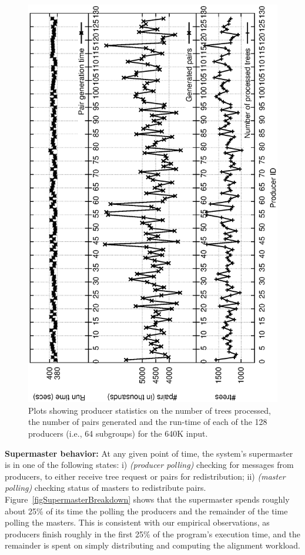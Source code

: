 \documentclass[10pt,journal,letterpaper,compsoc]{IEEEtran}
\begin{document}
\begin{figure}[h]
\centerline{
            \includegraphics[angle=-90, scale=0.33]{producer.eps}
}
\caption{
Plots showing producer statistics on the number of trees processed, the number of pairs generated and the run-time of each of the 128 producers (i.e., 64 subgroups) for the 640K input.
}
\label{figProducer}
\end{figure}

{\bf Supermaster behavior:} At any given point of time, the system's supermaster is in one of the following states: i) \emph{(producer polling)} checking for messages from producers, to either receive tree request or pairs for redistribution; ii) \emph{(master polling)} checking status of masters to redistribute pairs.  Figure~\ref{figSupermasterBreakdown} shows that the supermaster spends roughly about 25\% of its time the polling the producers and the remainder of the time polling the masters. This is consistent with our empirical observations, as producers finish roughly in the first 25\% of the program's execution time, and the remainder is spent on simply distributing and computing the alignment workload. 
\end{document}
